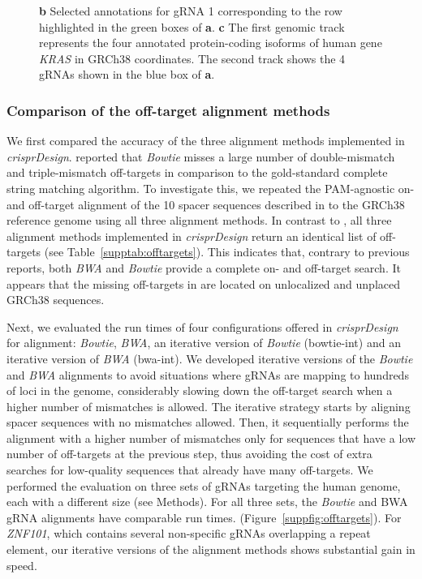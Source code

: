 \documentclass[pdftex,english,10pt]{article}
\begin{document}
\begin{figure}
{\textbf{b} Selected annotations for gRNA 1 corresponding to the row highlighted in the green boxes of \textbf{a}. 
\textbf{c} The first genomic track represents the four annotated protein-coding isoforms of human gene \textit{KRAS} in GRCh38 coordinates. The second track shows the 4 gRNAs shown in the blue box of \textbf{a}.
}
  \label{fig:guideset}
\end{figure}




\subsubsection*{Comparison of the off-target alignment methods}


We first compared the accuracy of the three alignment methods implemented in \textit{crisprDesign}. \citet{multicrispr} reported that \textit{Bowtie} misses a large number of double-mismatch and triple-mismatch off-targets in comparison to the gold-standard complete string matching algorithm.
To investigate this, we repeated the PAM-agnostic on- and off-target alignment of the 10 spacer sequences described in \citet{multicrispr} to the GRCh38 reference genome using all three alignment methods. In contrast to \citet{multicrispr}, all three alignment methods implemented in \textit{crisprDesign} return an identical list of off-targets (see Table~\ref{supptab:offtargets}). This indicates that, contrary to previous reports, both \textit{BWA} and \textit{Bowtie} provide a complete on- and off-target search. It appears that the missing off-targets in \citet{multicrispr} are located on unlocalized and unplaced GRCh38 sequences.

Next, we evaluated the run times of four configurations offered in \textit{crisprDesign} for alignment: \textit{Bowtie}, \textit{BWA}, an iterative version of \textit{Bowtie} (bowtie-int) and an iterative version of \textit{BWA} (bwa-int). We developed iterative versions of the \textit{Bowtie} and \textit{BWA} alignments to avoid situations where gRNAs are mapping to hundreds of loci in the genome, considerably slowing down the off-target search when a higher number of mismatches is allowed.  The iterative strategy starts by aligning spacer sequences with no mismatches allowed. Then, it sequentially performs the alignment with a higher number of mismatches only for sequences that have a low number of off-targets at the previous step, thus avoiding the cost of extra searches for low-quality sequences that already have many off-targets.  We performed the evaluation on three sets of gRNAs targeting the human genome, each with a different size (see Methods).  For all three sets, the \textit{Bowtie} and BWA gRNA alignments have comparable run times. (Figure~\ref{suppfig:offtargets}). For \textit{ZNF101}, which contains several non-specific gRNAs overlapping a repeat element, our iterative versions of the alignment methods shows substantial gain in speed. 
\end{document}
